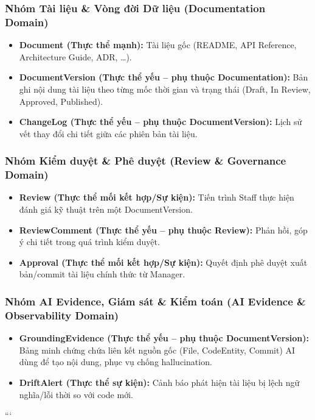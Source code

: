 \subsubsection{Nhóm Tài liệu \& Vòng đời Dữ liệu (Documentation Domain)}

\begin{itemize}

    \item \textbf{Document (Thực thể mạnh):}
    Tài liệu gốc (README, API Reference, Architecture Guide, ADR, \ldots).

    \item \textbf{DocumentVersion (Thực thể yếu -- phụ thuộc Documentation):}
    Bản ghi nội dung tài liệu theo từng mốc thời gian và trạng thái
    (Draft, In Review, Approved, Published).

    \item \textbf{ChangeLog (Thực thể yếu -- phụ thuộc DocumentVersion):}
    Lịch sử vết thay đổi chi tiết giữa các phiên bản tài liệu.

    

\end{itemize}


\subsubsection{Nhóm Kiểm duyệt \& Phê duyệt (Review \& Governance Domain)}

\begin{itemize}

    \item \textbf{Review (Thực thể mối kết hợp/Sự kiện):}
    Tiến trình Staff thực hiện đánh giá kỹ thuật trên một DocumentVersion.

    \item \textbf{ReviewComment (Thực thể yếu -- phụ thuộc Review):}
    Phản hồi, góp ý chi tiết trong quá trình kiểm duyệt.

    \item \textbf{Approval (Thực thể mối kết hợp/Sự kiện):}
    Quyết định phê duyệt xuất bản/commit tài liệu chính thức từ Manager.

\end{itemize}


\subsubsection{Nhóm AI Evidence, Giám sát \& Kiểm toán
(AI Evidence \& Observability Domain)}

\begin{itemize}

    \item \textbf{GroundingEvidence (Thực thể yếu -- phụ thuộc DocumentVersion):}
    Bảng minh chứng chứa liên kết nguồn gốc
    (File, CodeEntity, Commit) AI dùng để tạo nội dung,
    phục vụ chống hallucination.

    \item \textbf{DriftAlert (Thực thể sự kiện):}
    Cảnh báo phát hiện tài liệu bị lệch ngữ nghĩa/lỗi thời so với code mới.


\end{itemize}
```
